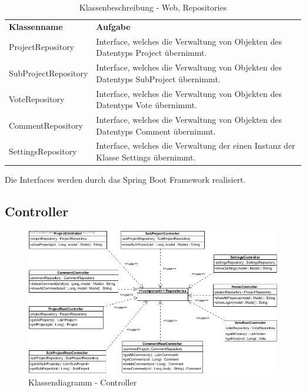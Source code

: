 \begin{table}[H]
	\centering
	\begin{tabularx}{\textwidth}{X X}
		\rowcolor[HTML]{C0C0C0} 
		\textbf{Klassenname} & \textbf{Aufgabe} \\
		ProjectRepository & Interface, welches die Verwaltung von Objekten des Datentyps Project übernimmt. \\
		\rowcolor[HTML]{E7E7E7}
		SubProjectRepository & Interface, welches die Verwaltung von Objekten des Datentyps SubProject übernimmt.  \\
		 VoteRepository &  Interface, welches die Verwaltung von Objekten des Datentyps Vote übernimmt. \\
		 \rowcolor[HTML]{E7E7E7}
		CommentRepository & Interface, welches die Verwaltung von Objekten des Datentyps Comment übernimmt. \\
		SettingsRepository & Interface, welches die Verwaltung der einen Instanz der Klasse Settings übernimmt.  \\
	\end{tabularx}
	\caption{Klassenbeschreibung - Web, Repositories}
	\label{table:klassenbeschreibung-web-repositories}
\end{table}

Die Interfaces werden durch das Spring Boot Framework realisiert.


\subsection{Controller}
\begin{figure}[H]
	\centering
	\includegraphics[width=\textwidth]{img/controller.png}	
	\caption{Klassendiagramm - Controller}
	\label{fig:klassendiagramm-cont}
\end{figure}

